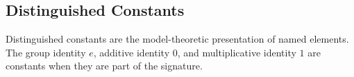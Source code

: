\subsection{Distinguished Constants}
\label{subsec:distinguished-constants}

\begin{remark*}[Exposition]
Distinguished constants are the model-theoretic presentation of named elements.
The group identity $e$, additive identity $0$, and multiplicative identity $1$
are constants when they are part of the signature.
\end{remark*}

